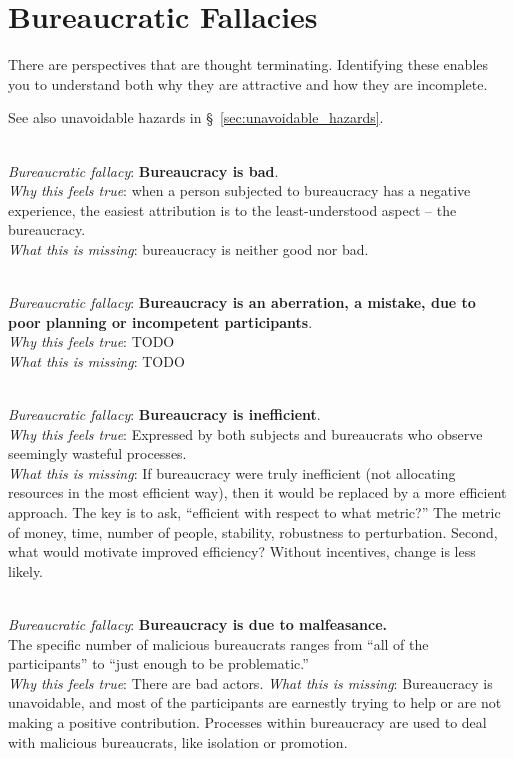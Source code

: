 \section{Bureaucratic Fallacies\label{sec:fallacies}}

There are perspectives that are \gls{thought terminating}. Identifying these enables you to understand both why they are attractive and how they are incomplete.

See also unavoidable hazards in \S~\ref{sec:unavoidable_hazards}.

\ \\

\textit{Bureaucratic fallacy}: \textbf{Bureaucracy is bad}. \\
\textit{Why this feels true}: when a person subjected to bureaucracy has a negative experience, the easiest attribution is to the least-understood aspect -- the bureaucracy.\\
\textit{What this is missing}: \Gls{bureaucracy} is neither good nor bad. 

\ \\

\textit{Bureaucratic fallacy}: \textbf{Bureaucracy is an aberration, a mistake, due to poor planning or incompetent participants}. \\
\textit{Why this feels true}: TODO\\
\textit{What this is missing}: TODO

\ \\

\textit{Bureaucratic fallacy}: \textbf{Bureaucracy is inefficient}. \\
\textit{Why this feels true}: Expressed by both subjects and bureaucrats who observe seemingly wasteful processes.\\
\textit{What this is missing}: If bureaucracy were truly inefficient (not allocating resources in the most efficient way), then it would be replaced by a more efficient approach. The key is to ask, ``efficient with respect to what metric?'' The metric of money, time, number of people, stability, robustness to perturbation.  Second, what would motivate improved efficiency? Without incentives, change is less likely. 

\ \\

\textit{Bureaucratic fallacy}: \textbf{Bureaucracy is due to malfeasance.}\\
The specific number of malicious bureaucrats ranges from ``all of the participants'' to ``just enough to be problematic.'' \\
\textit{Why this feels true}: There are bad actors. 
\textit{What this is missing}: Bureaucracy is unavoidable, and most of the participants are earnestly trying to help or are not making a positive contribution. Processes within bureaucracy are used to deal with malicious bureaucrats, like isolation or promotion. 


